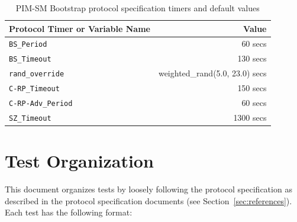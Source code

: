 \documentclass[11pt]{report}
\begin{document}
%
%
\newcommand{\PimsmBSPeriod}{60 secs}			%
\newcommand{\PimsmBSTimeout}{130 secs}			%
\newcommand{\PimsmRandOverride}{weighted\_rand(5.0, 23.0) secs} %
\newcommand{\PimsmCRPTimeout}{150 secs}			%
\newcommand{\PimsmCRPAdvPeriod}{60 secs}		%
\newcommand{\PimsmSZTimeout}{1300 secs}			%

\begin{table}[h]
\begin{center}
\begin{tabular}{|l|r|}
\hline
Protocol Timer or Variable Name	& Value		\\
\hline
\hline
\verb=BS_Period=		& 60 secs	\\
\verb=BS_Timeout=		& 130 secs	\\
\verb=rand_override=		& weighted\_rand(5.0, 23.0) secs \\
\verb=C-RP_Timeout=		& 150 secs	\\
\verb=C-RP-Adv_Period=		& 60 secs	\\
\verb=SZ_Timeout=		& 1300 secs	\\
\hline
\end{tabular}
\caption{PIM-SM Bootstrap protocol specification timers and default values}
\label{table:pim_sm_bootstrap_spec_values}
\end{center}
\end{table}

\section{Test Organization}

This document organizes tests by loosely following the protocol specification
as described in the protocol specification documents (see
Section~\ref{sec:references}). Each test has the following format:
\end{document}
